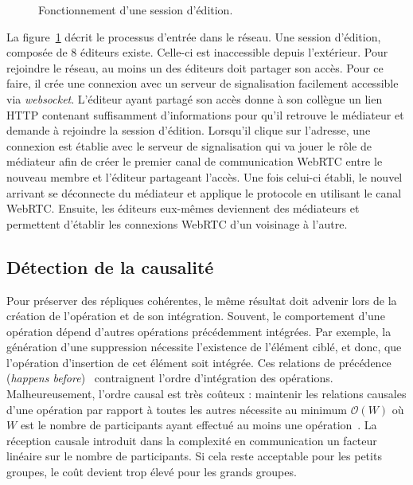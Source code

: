 \begin{figure}
  \begin{center}
    
    \caption[Fonctionnement d'une session d'édition]
    {\label{editor:fig:entering}Fonctionnement d'une session d'édition.}
  \end{center}
\end{figure}

La figure~\ref{editor:fig:entering} décrit le processus d'entrée dans le réseau.
Une session d'édition, composée de 8 éditeurs existe. Celle-ci est inaccessible
depuis l'extérieur. Pour rejoindre le réseau, au moins un des éditeurs doit
partager son accès. Pour ce faire, il crée une connexion avec un serveur de
signalisation facilement accessible via \emph{websocket}. L'éditeur ayant
partagé son accès donne à son collègue un lien HTTP contenant suffisamment
d'informations pour qu'il retrouve le médiateur et demande à rejoindre la
session d'édition. Lorsqu'il clique sur l'adresse, une connexion est établie
avec le serveur de signalisation qui va jouer le rôle de médiateur afin de créer
le premier canal de communication WebRTC entre le nouveau membre et l'éditeur
partageant l'accès. Une fois celui-ci établi, le nouvel arrivant se déconnecte
du médiateur et applique le protocole \SPRAY en utilisant le canal
WebRTC. Ensuite, les éditeurs eux-mêmes deviennent des médiateurs et permettent
d'établir les connexions WebRTC d'un voisinage à l'autre.

\subsection{Détection de la causalité}

Pour préserver des répliques cohérentes, le même résultat doit advenir lors de
la création de l'opération et de son intégration. Souvent, le comportement d'une
opération dépend d'autres opérations précédemment intégrées. Par exemple, la
génération d'une suppression nécessite l'existence de l'élément ciblé, et donc,
que l'opération d'insertion de cet élément soit intégrée. Ces relations de
précédence (\emph{happens before})~\cite{lamport1978time} contraignent l'ordre
d'intégration des opérations.  Malheureusement, l'ordre causal est très coûteux
: maintenir les relations causales d'une opération par rapport à toutes les
autres nécessite au minimum $\mathcal{O}(W)$ où $W$ est le nombre de
participants ayant effectué au moins une
opération~\cite{charronbost1991concerning}. La réception causale introduit dans
la complexité en communication un facteur linéaire sur le nombre de
participants. Si cela reste acceptable pour les petits groupes, le coût devient
trop élevé pour les grands groupes.

